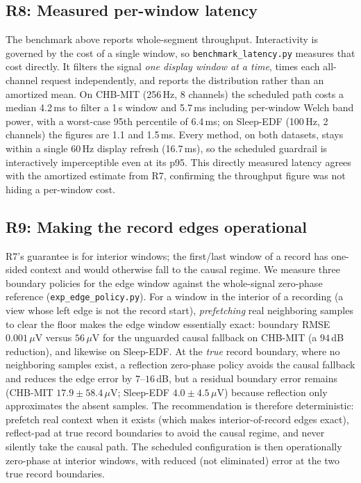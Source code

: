 \documentclass[conference]{IEEEtranSPMB}
\begin{document}
\subsection{R8: Measured per-window latency}
The benchmark above reports whole-segment throughput. Interactivity is governed by the cost of a
single window, so \texttt{benchmark\_latency.py} measures that cost directly. It filters the signal
\emph{one display window at a time}, times each all-channel request independently, and reports the
distribution rather than an amortized mean.
On CHB-MIT (256\,Hz, 8 channels) the scheduled path costs a median 4.2\,ms to filter a 1\,s window
and 5.7\,ms including per-window Welch band power, with a worst-case 95th percentile of 6.4\,ms; on
Sleep-EDF (100\,Hz, 2 channels) the figures are 1.1 and 1.5\,ms. Every method, on both datasets,
stays within a single 60\,Hz display refresh (16.7\,ms), so the scheduled guardrail is
interactively imperceptible even at its p95. This directly measured latency agrees with the
amortized estimate from R7, confirming the throughput figure was not hiding a per-window cost.

\subsection{R9: Making the record edges operational}
R7's guarantee is for interior windows; the first/last window of a record has one-sided context
and would otherwise fall to the causal regime. We measure three boundary policies for the edge
window against the whole-signal zero-phase reference (\texttt{exp\_edge\_policy.py}). For a window
in the interior of a recording (a view whose left edge is not
the record start), \emph{prefetching} real neighboring samples to clear the floor makes the edge
window essentially exact: boundary RMSE $0.001\,\mu$V versus $56\,\mu$V for the unguarded causal
fallback on CHB-MIT (a $94$\,dB reduction), and likewise on Sleep-EDF\@. At the \emph{true} record
boundary, where no neighboring samples exist, a reflection zero-phase policy avoids the causal
fallback and reduces the edge error by $7$--$16$\,dB, but a residual boundary error remains
(CHB-MIT $17.9\pm58.4\,\mu\mathrm{V}$; Sleep-EDF $4.0\pm4.5\,\mu\mathrm{V}$)
because reflection only approximates the
absent samples. The recommendation is therefore deterministic: prefetch real context when it
exists (which makes interior-of-record edges exact), reflect-pad at true record boundaries to
avoid the causal regime, and never silently take the causal path. The scheduled configuration is
then operationally zero-phase at interior windows, with reduced (not eliminated) error at the two
true record boundaries.
\end{document}
